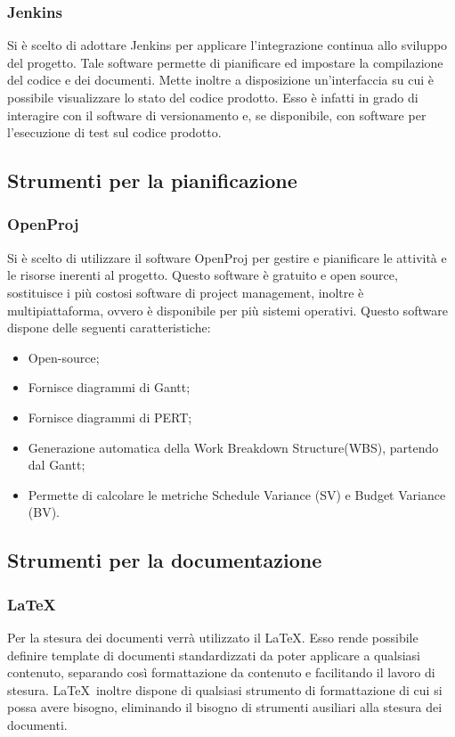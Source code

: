 \subsubsection{Jenkins}
\label{}
Si è scelto di adottare Jenkins per applicare l’integrazione continua allo sviluppo del progetto.
Tale software permette di pianificare ed impostare la compilazione del codice e dei documenti. 
Mette inoltre a disposizione un'interfaccia su cui è possibile visualizzare lo stato del codice prodotto. 
Esso è infatti in grado di interagire con il software di versionamento e, se disponibile, con software per l’esecuzione di test sul codice prodotto.



\subsection{Strumenti per la pianificazione}
\label{}
\subsubsection{OpenProj}
Si è scelto di utilizzare il software OpenProj per gestire e pianificare le attivit\`{a} e le risorse inerenti al progetto.
Questo software è gratuito e open source, sostituisce i più costosi software di project management, inoltre è multipiattaforma, ovvero è disponibile per più sistemi operativi.
Questo software dispone delle seguenti caratteristiche:
\begin{itemize}
\item Open-source;
\item Fornisce diagrammi di Gantt;
\item Fornisce diagrammi di PERT;
\item Generazione automatica della Work Breakdown Structure(WBS), partendo dal Gantt;
\item Permette di calcolare le metriche Schedule Variance (SV) e Budget Variance (BV).
\end{itemize}
\label{}


\subsection{Strumenti per la documentazione}
\label{}
\subsubsection{LaTeX}
\label{5.7}
Per la stesura dei documenti verrà utilizzato il  \LaTeX. Esso rende possibile definire template di documenti standardizzati da poter applicare a qualsiasi contenuto, separando così formattazione da contenuto e facilitando il lavoro di stesura. \LaTeX\ inoltre dispone di qualsiasi strumento di formattazione di cui si possa avere bisogno, eliminando il bisogno di strumenti ausiliari alla stesura dei documenti.

